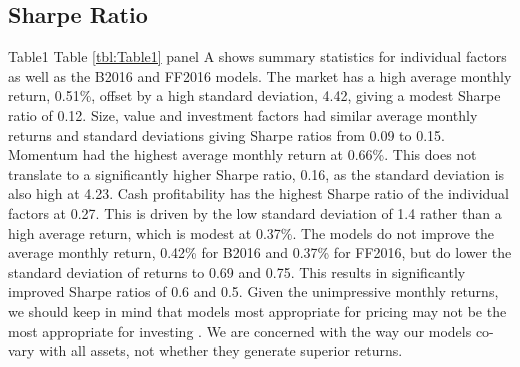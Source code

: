
\subsection{Sharpe Ratio}

{Table1}
Table \ref{tbl:Table1} panel A shows summary statistics for individual factors as well as
the  B2016 and FF2016 models. The market has a high average monthly return, 0.51\%,
offset by a high standard deviation,  4.42, giving a modest Sharpe ratio of 0.12. Size,
value and investment factors had similar average monthly returns and standard deviations
giving Sharpe ratios from 0.09 to 0.15. Momentum had the highest average monthly return at
0.66\%. This does not translate to a significantly higher Sharpe ratio, 0.16, as the
standard  deviation is also high at 4.23. Cash profitability has the highest Sharpe ratio
of the individual factors at 0.27. This is driven by the low standard deviation of 1.4
rather than a high average return, which  is modest at 0.37\%. The models do not improve
the average monthly return, 0.42\% for B2016 and 0.37\% for  FF2016, but do lower the
standard deviation of returns to 0.69 and 0.75. This results in significantly improved
Sharpe ratios of 0.6 and 0.5. Given the unimpressive monthly returns, we should keep in
mind that models most  appropriate for pricing may not be the most appropriate for
investing  \parencite{pastor2000comparing}. We are concerned with the way our models co-
vary with all assets, not whether they  generate superior returns.

